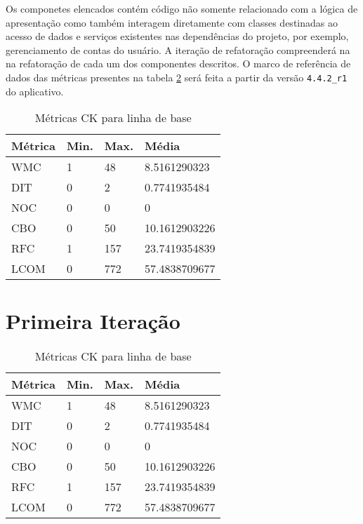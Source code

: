 Os componetes elencados contém código não somente relacionado com a lógica de
apresentação como também interagem diretamente com classes destinadas ao acesso
de dados e serviços existentes nas dependências do projeto, por exemplo,
gerenciamento de contas do usuário. A iteração de refatoração compreenderá na
na refatoração de cada um dos componentes descritos. O marco de referência de
dados das métricas presentes na tabela \ref{tab:baseline} será feita a partir da
versão \verb|4.4.2_r1| do aplicativo.

\begin{table}
	\centering
    \begin{tabular}{ | l | l | l | l |}
    \hline
    Métrica & Min. & Max. & Média \\ \hline
    WMC & 1 & 48  	& 8.5161290323   \\ \hline
    DIT	& 0	& 2		&0.7741935484\\ \hline
	NOC & 0	& 0		& 0\\ \hline
	CBO	& 0	& 50	& 10.1612903226\\ \hline
	RFC	& 1	& 157	& 23.7419354839\\ \hline
	LCOM	& 0		& 772	& 57.4838709677\\ \hline
    \end{tabular}
    \caption{Métricas CK para linha de base}
    \label{tab:baseline}
\end{table}



\section{Primeira Iteração}

\begin{table}
	\centering
    \begin{tabular}{ | l | l | l | l |}
    \hline
    Métrica & Min. & Max. & Média \\ \hline
    WMC & 1 & 48  	& 8.5161290323   \\ \hline
    DIT	& 0	& 2		&0.7741935484\\ \hline
	NOC & 0	& 0		& 0\\ \hline
	CBO	& 0	& 50	& 10.1612903226\\ \hline
	RFC	& 1	& 157	& 23.7419354839\\ \hline
	LCOM	& 0		& 772	& 57.4838709677\\ \hline
    \end{tabular}
    \caption{Métricas CK para linha de base}
    \label{tab:baseline}
\end{table}

